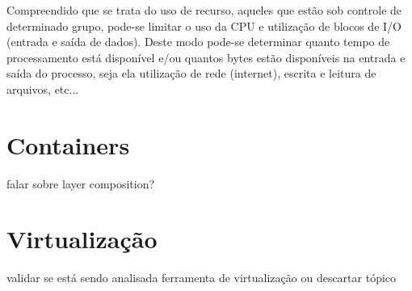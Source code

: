 Compreendido que se trata do uso de recurso, aqueles que estão sob controle de determinado grupo, pode-se limitar o uso da CPU e utilização de blocos de I/O (entrada e saída de dados). Deste modo pode-se determinar quanto tempo de processamento está disponível e/ou quantos bytes estão disponíveis na entrada e saída do processo, seja ela utilização de rede (internet), escrita e leitura de arquivos, etc...

\section{Containers}
falar sobre layer composition?

\section{Virtualização}
validar se está sendo analisada ferramenta de virtualização ou descartar tópico
